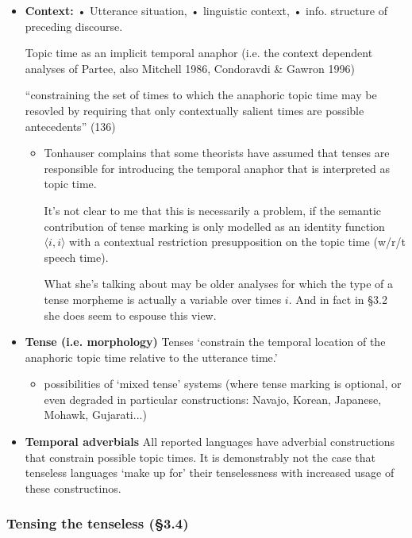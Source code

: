 \documentclass[10pt]{article}
\begin{document}
\begin{itemize}
\item \textbf{Context:} • Utterance situation, • linguistic context, • info. structure of preceding discourse.

Topic time as an implicit temporal anaphor (i.e. the context dependent analyses of Partee, also Mitchell 1986, Condoravdi \& Gawron 1996)

``constraining the set of times to which the anaphoric topic time may be resovled by requiring that only contextually salient times are possible antecedents'' (136)

\begin{itemize}
	\item Tonhauser complains that some theorists have assumed that tenses are responsible for introducing the temporal anaphor that is interpreted as topic time.
	
	It's not clear to me that this is necessarily a problem, if the semantic contribution of tense marking is only modelled as an identity function $\langle i,i\rangle$ with a contextual restriction presupposition on the topic time (w/r/t speech time). 
	
	What she's talking about may be older analyses for which the type of a tense morpheme is actually a variable over times $i$. And in fact in §3.2 she does seem to espouse this view.
\end{itemize}
\item \textbf{Tense (i.e. morphology)} Tenses `constrain the temporal location of the anaphoric topic time relative to the utterance time.'

\begin{itemize}


\item possibilities of `mixed tense' systems (where tense marking is optional, or even degraded in particular constructions: Navajo, Korean, Japanese, Mohawk, Gujarati...)
\end{itemize}


\item \textbf{Temporal adverbials} All reported languages have adverbial constructions that constrain possible topic times. It is demonstrably not the case that tenseless languages `make up for' their tenselessness with increased usage of these constructinos.
\end{itemize}

\subsubsection*{Tensing the tenseless (§3.4)}
\end{document}
